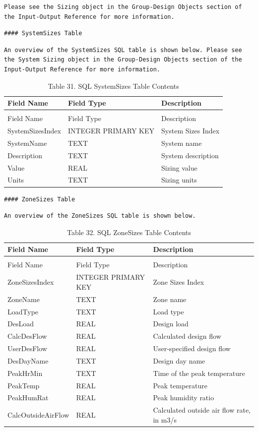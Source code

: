 \begin{lstlisting}
Please see the Sizing object in the Group-Design Objects section of the Input-Output Reference for more information.
\end{lstlisting}

\begin{lstlisting}
#### SystemSizes Table
\end{lstlisting}

\begin{lstlisting}
An overview of the SystemSizes SQL table is shown below. Please see the System Sizing object in the Group-Design Objects section of the Input-Output Reference for more information.
\end{lstlisting}

\begin{longtable}[c]{@{}lll@{}}
\caption{Table 31. SQL SystemSizes Table Contents \label{table:table-31.-sql-systemsizes-table-contents}} \tabularnewline
\toprule 
Field Name & Field Type & Description \tabularnewline
\midrule
\endfirsthead

\caption[]{Table 31. SQL SystemSizes Table Contents} \tabularnewline
\toprule 
Field Name & Field Type & Description \tabularnewline
\midrule
\endhead

SystemSizesIndex & INTEGER PRIMARY KEY & System Sizes Index \tabularnewline
SystemName & TEXT & System name \tabularnewline
Description & TEXT & System description \tabularnewline
Value & REAL & Sizing value \tabularnewline
Units & TEXT & Sizing units \tabularnewline
\bottomrule
\end{longtable}

\begin{lstlisting}
#### ZoneSizes Table
\end{lstlisting}

\begin{lstlisting}
An overview of the ZoneSizes SQL table is shown below.
\end{lstlisting}

\begin{longtable}[c]{p{1.5in}p{1.5in}p{2.99in}}
\caption{Table 32. SQL ZoneSizes Table Contents \label{table:table-32.-sql-zonesizes-table-contents}} \tabularnewline
\toprule 
Field Name & Field Type & Description \tabularnewline
\midrule
\endfirsthead

\caption[]{Table 32. SQL ZoneSizes Table Contents} \tabularnewline
\toprule 
Field Name & Field Type & Description \tabularnewline
\midrule
\endhead

ZoneSizesIndex & INTEGER PRIMARY KEY & Zone Sizes Index \tabularnewline
ZoneName & TEXT & Zone name \tabularnewline
LoadType & TEXT & Load type \tabularnewline
DesLoad & REAL & Design load \tabularnewline
CalcDesFlow & REAL & Calculated design flow \tabularnewline
UserDesFlow & REAL & User-specified design flow \tabularnewline
DesDayName & TEXT & Design day name \tabularnewline
PeakHrMin & TEXT & Time of the peak temperature \tabularnewline
PeakTemp & REAL & Peak temperature \tabularnewline
PeakHumRat & REAL & Peak humidity ratio \tabularnewline
CalcOutsideAirFlow & REAL & Calculated outside air flow rate, in m3/s \tabularnewline
\bottomrule
\end{longtable}

